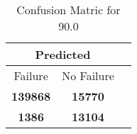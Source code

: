 \begin{table}[] 
\caption{Confusion Matric for 90.0} 
\label{Table: Prediction Accuracy-None90.0RandomForest100EKF-ignoreReflection-Reflection} 
\centering 
\begin{tabular} 
 {@{}ccc@{}} 
\toprule 
\multicolumn{2}{c}{\textbf{Predicted}}
 \\ \midrule 
\multicolumn{1}{|c|}{Failure} & 
\multicolumn{1}{c|}{No Failure}
 \\ \midrule 
\multicolumn{1}{|c|}{\color{green}\textbf{139868}} & 
\multicolumn{1}{c|}{\color{green}\textbf{15770}}
 \\ \midrule 
\multicolumn{1}{|c|}{\color{red}\textbf{1386}} & 
\multicolumn{1}{c|}{\color{red}\textbf{13104}}
 \\ \bottomrule 
\end{tabular} 
\end{table} 
